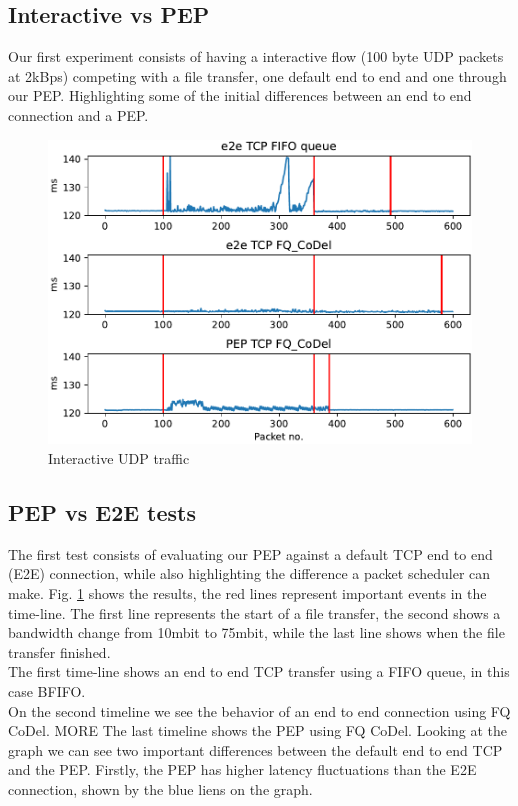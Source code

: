 \documentclass[a4paper,english, 11pt]{report}
\begin{document}
\subsection{Interactive vs PEP}
Our first experiment consists of having a interactive flow (100 byte UDP packets at 2kBps) competing with a file transfer, one default end to end and one through our PEP. Highlighting some of the initial differences between an end to end connection and a PEP.\\


\begin{figure}[h] %
	\centering
	\includegraphics[scale=0.50]{../diagrams/graphs/initial_udp_latency_timeseries.pdf}
  	\caption{Interactive UDP traffic}
  	\label{fig:inital_test}
\end{figure}

\subsection{PEP vs E2E tests}
The first test consists of evaluating our PEP against a default TCP end to end (E2E) connection, while also highlighting the difference a packet scheduler can make. Fig. \ref{fig:inital_test} shows the results, the red lines represent important events in the time-line.
The first line represents the start of a file transfer, the second shows a bandwidth change from 10mbit to 75mbit, while the last line shows when the file transfer finished.\\ 

The first time-line shows an end to end TCP transfer using a FIFO queue, in this case BFIFO.\\ 
On the second timeline we see the behavior of an end to end connection using FQ CoDel. {MORE}
The last timeline shows the PEP using FQ CoDel. Looking at the graph we can see two important differences between the default end to end TCP and the PEP. Firstly, the PEP has higher latency fluctuations than the E2E connection, shown by the blue liens on the graph. 
\end{document}
